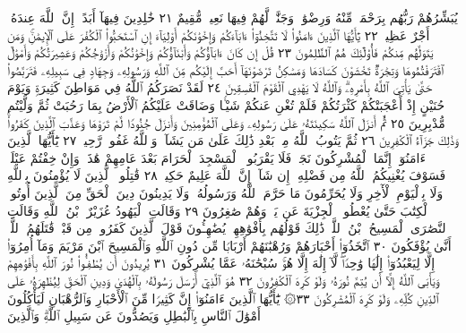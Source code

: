 يُبَشِّرُهُمْ رَبُّهُم بِرَحْمَةࣲ مِّنْهُ وَرِضْوَٰنࣲ وَجَنَّٰتࣲ لَّهُمْ فِيهَا
نَعِيمࣱ مُّقِيمٌ ٢١ خَٰلِدِينَ فِيهَآ أَبَدًاۚ إِنَّ ٱللَّهَ عِندَهُۥٓ أَجْرٌ
عَظِيمࣱ ٢٢ يَٰٓأَيُّهَا ٱلَّذِينَ ءَامَنُوا۟ لَا تَتَّخِذُوٓا۟ ءَابَآءَكُمْ
وَإِخْوَٰنَكُمْ أَوْلِيَآءَ إِنِ ٱسْتَحَبُّوا۟ ٱلْكُفْرَ عَلَى ٱلْإِيمَٰنِۚ
وَمَن يَتَوَلَّهُم مِّنكُمْ فَأُو۟لَٰٓئِكَ هُمُ ٱلظَّٰلِمُونَ ٢٣ قُلْ إِن
كَانَ ءَابَآؤُكُمْ وَأَبْنَآؤُكُمْ وَإِخْوَٰنُكُمْ وَأَزْوَٰجُكُمْ
وَعَشِيرَتُكُمْ وَأَمْوَٰلٌ ٱقْتَرَفْتُمُوهَا وَتِجَٰرَةࣱ تَخْشَوْنَ
كَسَادَهَا وَمَسَٰكِنُ تَرْضَوْنَهَآ أَحَبَّ إِلَيْكُم مِّنَ ٱللَّهِ
وَرَسُولِهِۦ وَجِهَادࣲ فِي سَبِيلِهِۦ فَتَرَبَّصُوا۟ حَتَّىٰ يَأْتِيَ ٱللَّهُ
بِأَمْرِهِۦۗ وَٱللَّهُ لَا يَهْدِي ٱلْقَوْمَ ٱلْفَٰسِقِينَ ٢٤ لَقَدْ نَصَرَكُمُ
ٱللَّهُ فِي مَوَاطِنَ كَثِيرَةࣲ وَيَوْمَ حُنَيْنٍ إِذْ أَعْجَبَتْكُمْ
كَثْرَتُكُمْ فَلَمْ تُغْنِ عَنكُمْ شَيْـࣰٔا وَضَاقَتْ عَلَيْكُمُ
ٱلْأَرْضُ بِمَا رَحُبَتْ ثُمَّ وَلَّيْتُم مُّدْبِرِينَ ٢٥ ثُمَّ أَنزَلَ ٱللَّهُ
سَكِينَتَهُۥ عَلَىٰ رَسُولِهِۦ وَعَلَى ٱلْمُؤْمِنِينَ وَأَنزَلَ جُنُودࣰا
لَّمْ تَرَوْهَا وَعَذَّبَ ٱلَّذِينَ كَفَرُوا۟ۚ وَذَٰلِكَ جَزَآءُ ٱلْكَٰفِرِينَ ٢٦
ثُمَّ يَتُوبُ ٱللَّهُ مِنۢ بَعْدِ ذَٰلِكَ عَلَىٰ مَن يَشَآءُۗ وَٱللَّهُ
غَفُورࣱ رَّحِيمࣱ ٢٧ يَٰٓأَيُّهَا ٱلَّذِينَ ءَامَنُوٓا۟ إِنَّمَا ٱلْمُشْرِكُونَ
نَجَسࣱ فَلَا يَقْرَبُوا۟ ٱلْمَسْجِدَ ٱلْحَرَامَ بَعْدَ عَامِهِمْ هَٰذَاۚ
وَإِنْ خِفْتُمْ عَيْلَةࣰ فَسَوْفَ يُغْنِيكُمُ ٱللَّهُ مِن فَضْلِهِۦٓ
إِن شَآءَۚ إِنَّ ٱللَّهَ عَلِيمٌ حَكِيمࣱ ٢٨ قَٰتِلُوا۟ ٱلَّذِينَ
لَا يُؤْمِنُونَ بِٱللَّهِ وَلَا بِٱلْيَوْمِ ٱلْأٓخِرِ وَلَا يُحَرِّمُونَ
مَا حَرَّمَ ٱللَّهُ وَرَسُولُهُۥ وَلَا يَدِينُونَ دِينَ ٱلْحَقِّ مِنَ
ٱلَّذِينَ أُوتُوا۟ ٱلْكِتَٰبَ حَتَّىٰ يُعْطُوا۟ ٱلْجِزْيَةَ عَن يَدࣲ
وَهُمْ صَٰغِرُونَ ٢٩ وَقَالَتِ ٱلْيَهُودُ عُزَيْرٌ ٱبْنُ ٱللَّهِ
وَقَالَتِ ٱلنَّصَٰرَى ٱلْمَسِيحُ ٱبْنُ ٱللَّهِۖ ذَٰلِكَ قَوْلُهُم
بِأَفْوَٰهِهِمْۖ يُضَٰهِـُٔونَ قَوْلَ ٱلَّذِينَ كَفَرُوا۟ مِن قَبْلُۚ
قَٰتَلَهُمُ ٱللَّهُۖ أَنَّىٰ يُؤْفَكُونَ ٣٠ ٱتَّخَذُوٓا۟ أَحْبَارَهُمْ
وَرُهْبَٰنَهُمْ أَرْبَابࣰا مِّن دُونِ ٱللَّهِ وَٱلْمَسِيحَ ٱبْنَ
مَرْيَمَ وَمَآ أُمِرُوٓا۟ إِلَّا لِيَعْبُدُوٓا۟ إِلَٰهࣰا وَٰحِدࣰاۖ
لَّآ إِلَٰهَ إِلَّا هُوَۚ سُبْحَٰنَهُۥ عَمَّا يُشْرِكُونَ ٣١
يُرِيدُونَ أَن يُطْفِـُٔوا۟ نُورَ ٱللَّهِ بِأَفْوَٰهِهِمْ وَيَأْبَى ٱللَّهُ إِلَّآ أَن
يُتِمَّ نُورَهُۥ وَلَوْ كَرِهَ ٱلْكَٰفِرُونَ ٣٢ هُوَ ٱلَّذِيٓ أَرْسَلَ
رَسُولَهُۥ بِٱلْهُدَىٰ وَدِينِ ٱلْحَقِّ لِيُظْهِرَهُۥ عَلَى ٱلدِّينِ
كُلِّهِۦ وَلَوْ كَرِهَ ٱلْمُشْرِكُونَ ٣٣۞ يَٰٓأَيُّهَا ٱلَّذِينَ
ءَامَنُوٓا۟ إِنَّ كَثِيرࣰا مِّنَ ٱلْأَحْبَارِ وَٱلرُّهْبَانِ لَيَأْكُلُونَ
أَمْوَٰلَ ٱلنَّاسِ بِٱلْبَٰطِلِ وَيَصُدُّونَ عَن سَبِيلِ ٱللَّهِۗ وَٱلَّذِينَ
